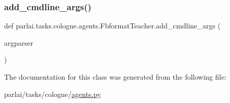 \subsubsection{\texorpdfstring{add\+\_\+cmdline\+\_\+args()}{add\_cmdline\_args()}}
{\footnotesize\ttfamily def parlai.\+tasks.\+cologne.\+agents.\+Fbformat\+Teacher.\+add\+\_\+cmdline\+\_\+args (\begin{DoxyParamCaption}\item[{}]{argparser }\end{DoxyParamCaption})\hspace{0.3cm}{\ttfamily [static]}}



The documentation for this class was generated from the following file\+:\begin{DoxyCompactItemize}
\item 
parlai/tasks/cologne/\hyperlink{parlai_2tasks_2cologne_2agents_8py}{agents.\+py}\end{DoxyCompactItemize}
